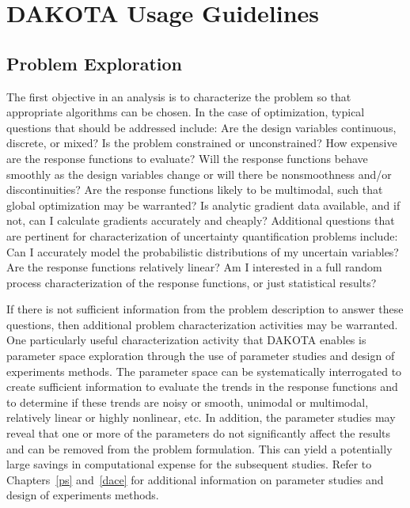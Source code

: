 \chapter{DAKOTA Usage Guidelines}\label{usage}

\section{Problem Exploration}\label{usage:exploration}

The first objective in an analysis is to characterize the problem so
that appropriate algorithms can be chosen. In the case of
optimization, typical questions that should be addressed include: Are
the design variables continuous, discrete, or mixed? Is the problem
constrained or unconstrained? How expensive are the response functions
to evaluate? Will the response functions behave smoothly as the design
variables change or will there be nonsmoothness and/or
discontinuities? Are the response functions likely to be multimodal,
such that global optimization may be warranted? Is analytic gradient
data available, and if not, can I calculate gradients accurately and
cheaply? Additional questions that are pertinent for characterization
of uncertainty quantification problems include: Can I accurately model
the probabilistic distributions of my uncertain variables? Are the
response functions relatively linear? Am I interested in a full random
process characterization of the response functions, or just
statistical results?

If there is not sufficient information from the problem description to
answer these questions, then additional problem characterization
activities may be warranted. One particularly useful characterization
activity that DAKOTA enables is parameter space exploration through
the use of parameter studies and design of experiments methods. The
parameter space can be systematically interrogated to create
sufficient information to evaluate the trends in the response
functions and to determine if these trends are noisy or smooth,
unimodal or multimodal, relatively linear or highly nonlinear, etc. In
addition, the parameter studies may reveal that one or more of the
parameters do not significantly affect the results and can be removed
from the problem formulation. This can yield a potentially large
savings in computational expense for the subsequent studies. Refer to
Chapters~\ref{ps} and~\ref{dace} for additional information on
parameter studies and design of experiments methods.

